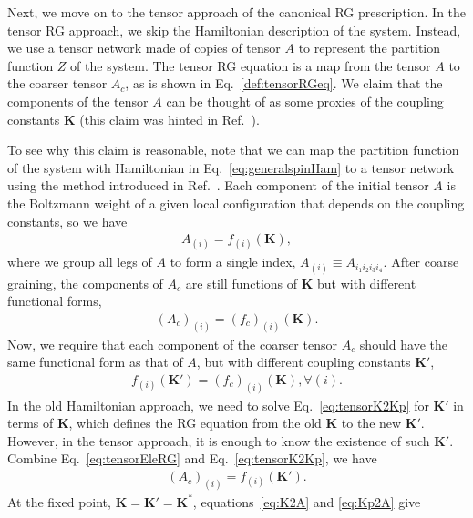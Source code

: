 \documentclass[aps,prr,reprint,superscriptaddress,floatfix]{revtex4-2}
\begin{document}
Next, we move on to the tensor approach of the canonical RG prescription.
In the tensor RG approach, we skip the Hamiltonian description of the system. 
Instead, we use a tensor network made of copies of tensor $A$ to represent the partition function $Z$ of the system. 
The tensor RG equation is a map from the tensor $A$ to the coarser tensor $A_c$, as is shown in Eq.~\eqref{def:tensorRGeq}.
We claim that the components of the tensor $A$ can be thought of as some proxies of the coupling constants $\mathbf{K}$ (this claim was hinted in Ref.~\cite{GuWen2009}).
%

To see why this claim is reasonable, note that we can map the partition function of the system with Hamiltonian in Eq.~\eqref{eq:generalspinHam} to a tensor network using the method introduced in Ref.~\cite{trg}. 
Each component of the initial tensor $A$ is the Boltzmann weight of a given local configuration that depends on the coupling constants, so we have 
%
\begin{align}\label{eq:K2A}
    A_{(i)} = f_{(i)}\left(\mathbf{K}\right),
\end{align}
%
where we group all legs of $A$ to form a single index, $A_{(i)}\equiv A_{i_1 i_2 i_3 i_4}$. 
After coarse graining, the components of $A_c$ are still functions of $\mathbf{K}$ but
with different functional forms,
%
\begin{align}\label{eq:tensorEleRG}
    \left(A_c\right)_{(i)} =
\left(f_c\right)_{(i)}\left(\mathbf{K}\right).
\end{align}
%
Now, we require that each component of the coarser tensor $A_c$ should have the same functional form as that of $A$, but with different coupling constants $\mathbf{K}'$,
%
\begin{align}\label{eq:tensorK2Kp}
    f_{(i)}\left(\mathbf{K}'\right) =
    \left(f_c\right)_{(i)}\left(\mathbf{K}\right), \forall (i).
\end{align}
%
In the old Hamiltonian approach, we need to solve Eq.~\eqref{eq:tensorK2Kp} for $\mathbf{K}'$ in terms of $\mathbf{K}$, which defines the RG equation from the old $\mathbf{K}$ to the new $\mathbf{K}'$. 
However, in the tensor approach, it is enough to know the existence of such $\mathbf{K}'$. Combine Eq.~\eqref{eq:tensorEleRG} and Eq.~\eqref{eq:tensorK2Kp}, we have
%
\begin{align}\label{eq:Kp2A}
    \left(A_c\right)_{(i)} = f_{(i)}\left(\mathbf{K}'\right).
\end{align}
%
At the fixed point, $\mathbf{K} = \mathbf{K}' = \mathbf{K}^*$, equations~\eqref{eq:K2A} and \eqref{eq:Kp2A} give
\end{document}
